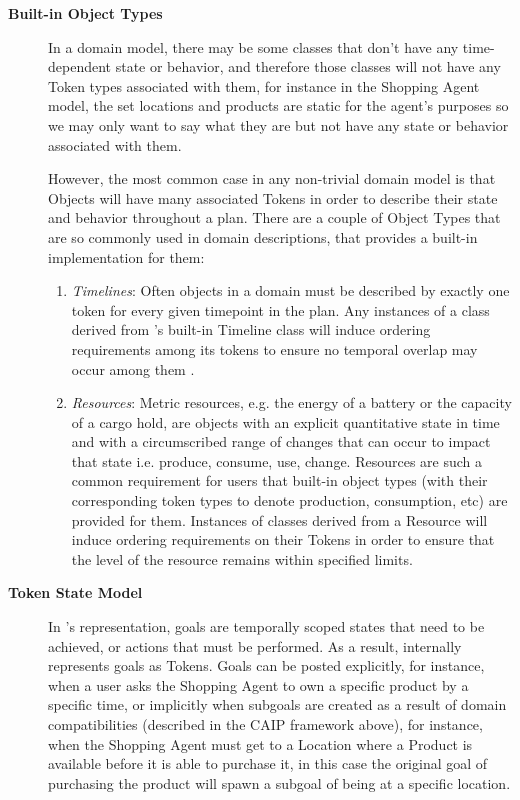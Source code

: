 \begin{description}
\begin{enumerate}
  \end{enumerate}

\item[\textbf{Built-in Object Types}] In a domain model, there may be some classes that don't have any time-dependent state or behavior, and therefore those classes will not have any Token types associated with them, for instance in the Shopping Agent model, the set locations and products are static for the agent's purposes so we may only want to say what they are but not have any state or behavior associated with them.

However, the most common case in any non-trivial domain model is that Objects will have many associated Tokens in order to describe their state and behavior throughout a plan. There are a couple of Object Types that are so commonly used in domain descriptions, that \eu provides a built-in implementation for them:

\begin{enumerate}
    \item \textit{Timelines}: Often objects in a domain must be described by exactly one
    token for every given timepoint in the plan. Any instances of a class derived from \eu's built-in
    Timeline class will induce ordering requirements among its tokens
     to ensure no temporal overlap may occur among them  \cite{mus94}. 

    \item \textit{Resources}: Metric resources, e.g. the energy of a battery or the
    capacity of a cargo hold, are objects with an explicit quantitative
    state in time and with a circumscribed range of changes that can occur
     to impact that state i.e. produce, consume, use, change. 
     Resources are such a common requirement for \eu users that built-in object types (with their corresponding token types to denote production, consumption, etc) are provided for them. Instances of classes derived from a Resource will induce
     ordering requirements on their Tokens in order to ensure that the
     level of the resource remains within specified limits.
\end{enumerate}

\item[\textbf{Token State Model}] In \eu's representation, goals are temporally scoped states that need to be achieved, or actions that must be performed. As a result, \eu internally represents goals as Tokens.  Goals can be posted explicitly, for instance, when a user asks the Shopping Agent to own a specific product by a specific time, or implicitly when subgoals are created as a result of domain compatibilities (described in the CAIP framework above), for instance, when the Shopping Agent must get to a Location where a Product is available before it is able to purchase it, in this case the original goal of purchasing the product will spawn a subgoal of being at a specific location.


\end{description}
